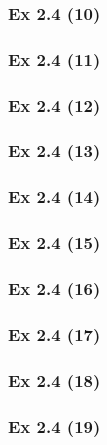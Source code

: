\subsubsection{Ex 2.4 (10)}\label{sec:Ex_2.4.10}

\newpage		%


\subsubsection{Ex 2.4 (11)}\label{sec:Ex_2.4.11}

\subsubsection{Ex 2.4 (12)}\label{sec:Ex_2.4.12}

\subsubsection{Ex 2.4 (13)}\label{sec:Ex_2.4.13}

\subsubsection{Ex 2.4 (14)}\label{sec:Ex_2.4.14}

\subsubsection{Ex 2.4 (15)}\label{sec:Ex_2.4.15}

\subsubsection{Ex 2.4 (16)}\label{sec:Ex_2.4.16}

\subsubsection{Ex 2.4 (17)}\label{sec:Ex_2.4.17}

\subsubsection{Ex 2.4 (18)}\label{sec:Ex_2.4.18}

\subsubsection{Ex 2.4 (19)}\label{sec:Ex_2.4.19}


